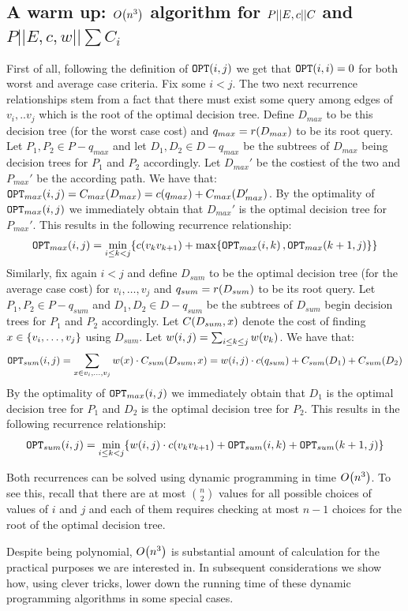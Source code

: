 \subsection{A warm up: $O\mathopen{}\left( n^3 \right)$ algorithm for $P||E,c|| C $ and $P||E,c, w|| \sum C_i$}

First of all, following the definition of $\texttt{OPT}\mathopen{}\left( i,j \right)$ we get that $\texttt{OPT}\mathopen{}\left( i,i \right)=0$ for both worst and average case criteria.
Fix some $i<j$. The two next recurrence relationships stem from a fact that  there must exist some query among edges of $v_i,..v_j$ which is the root of the optimal decision tree. Define $D_{max}$ to be this decision tree (for the worst case cost) and $q_{max}=r\mathopen{}\left( D_{max} \right)$ to be its root query. Let $P_1,P_2\in P-q_{max}$ and let $D_1, D_2\in D-q_{max}$ be the subtrees of $D_{max}$ being decision trees for $P_1$ and $P_2$ accordingly. Let $D_{max}'$ be the costiest of the two and $P_{max}'$ be the according path. We have that: $\texttt{OPT}_{max}\mathopen{}\left( i,j \right)=C_{max}\mathopen{}\left( D_{max} \right)=c\mathopen{}\left( q_{max} \right)+C_{max}\mathopen{}\left( D_{max}' \right)$. 
By the optimality of $\texttt{OPT}_{max}\mathopen{}\left( i,j \right)$ we immediately obtain that $D_{max}'$ is the optimal decision tree for $P_{max}'$. This results in the following recurrence relationship:
$$
\texttt{OPT}_{max}\mathopen{}\left( i,j \right) = \min_{i\leq k<j}\mathopen{}\left\{ c\mathopen{}\left( v_kv_{k+1} \right)+\max\mathopen{}\left\{ \texttt{OPT}_{max}\mathopen{}\left( i, k \right), \texttt{OPT}_{max}\mathopen{}\left( k+1, j \right) \right\} \right\}
$$
Similarly, fix again $i<j$ and define $D_{sum}$ to be the optimal decision tree (for the average case cost) for $v_i,\dots,v_j$ and $q_{sum}=r\mathopen{}\left( D_{sum} \right)$ to be its root query. Let $P_1,P_2\in P-q_{sum}$ and $D_1, D_2\in D-q_{sum}$ be the subtrees of $D_{sum}$ begin decision trees for $P_1$ and $P_2$ accordingly. Let $C\mathopen{}\left( D_{sum}, x \right)$ denote the cost of finding $x\in\mathopen{}\left\{ v_i,\dots,v_j \right\}$ using $D_{sum}$. Let $w\mathopen{}\left( i,j \right)=\sum_{i\leq k\leq j}w\mathopen{}\left( v_k \right)$. We have that:
$$
\texttt{OPT}_{sum}\mathopen{}\left( i,j \right)=\sum_{x\in v_i,\dots,v_j}w\mathopen{}\left( x \right)\cdot C_{sum}\mathopen{}\left( D_{sum}, x \right)=w\mathopen{}\left( i,j \right)\cdot c\mathopen{}\left( q_{sum} \right) + C_{sum}\mathopen{}\left( D_1 \right) + C_{sum}\mathopen{}\left( D_2 \right)
$$
By the optimality of $\texttt{OPT}_{max}\mathopen{}\left( i,j \right)$ we immediately obtain that $D_1$ is the optimal decision tree for $P_1$ and $D_2$ is the optimal decision tree for $P_2$. This results in the following recurrence relationship:
$$
\texttt{OPT}_{sum}\mathopen{}\left( i,j \right) = \min_{i\leq k<j}\mathopen{}\left\{ w\mathopen{}\left( i,j \right)\cdot c\mathopen{}\left( v_kv_{k+1} \right)+\texttt{OPT}_{sum}\mathopen{}\left( i, k \right)+ \texttt{OPT}_{sum}\mathopen{}\left( k+1, j \right) \right\}
$$

Both recurrences can be solved using dynamic programming in time $O\mathopen{}\left( n^3 \right)$. To see this, recall that there are at most $\binom{n}{2}$ values for all possible choices of values of $i$ and $j$ and each of them requires checking at most $n-1$ choices for the root of the optimal decision tree.

Despite being polynomial, $O\mathopen{}\left( n^3 \right)$ is substantial amount of calculation for the practical purposes we are interested in. In subsequent considerations we show how, using clever tricks, lower down the running time of these dynamic programming algorithms in some special cases. 
